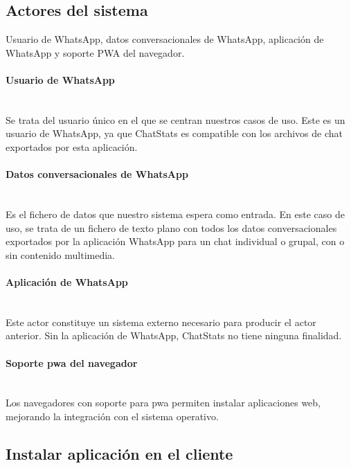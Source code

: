 \subsection{Actores del sistema}
\label{subsec:system-actors}

Usuario de WhatsApp, datos conversacionales de WhatsApp, aplicación de WhatsApp y soporte PWA del navegador.

\paragraph{Usuario de WhatsApp}\mbox{}\\

Se trata del usuario único en el que se centran nuestros casos de uso. Este es un usuario de WhatsApp, ya que ChatStats es compatible con los archivos de chat exportados por esta aplicación.

\paragraph{Datos conversacionales de WhatsApp}\mbox{}\\

Es el fichero de datos que nuestro sistema espera como entrada. En este caso de uso, se trata de un fichero de texto plano con todos los datos conversacionales exportados por la aplicación WhatsApp para un chat individual o grupal, con o sin contenido multimedia.

\paragraph{Aplicación de WhatsApp}\mbox{}\\

Este actor constituye un sistema externo necesario para producir el actor anterior. Sin la aplicación de WhatsApp, ChatStats no tiene ninguna finalidad.

\paragraph{Soporte \acrshort{pwa} del navegador}\mbox{}\\

Los navegadores con soporte para \acrfull{pwa} permiten instalar aplicaciones web, mejorando la integración con el sistema operativo.

\subsection{Instalar aplicación en el cliente}

